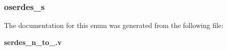 \subsubsection[{O\-S\-E\-R\-D\-E\-S2}]{ {\bfseries \textcolor{vhdlchar}{oserdes\-\_\-s}\textcolor{vhdlchar}{ }} \hspace{0.3cm}}\label{enum1serdes__n__to__1_a0f24d0f45260c4f9009584d09a117ce9}


The documentation for this enum was generated from the following file\-:\begin{DoxyCompactItemize}
\item 
{\bf serdes\-\_\-n\-\_\-to\-\_.\-v}\end{DoxyCompactItemize}
